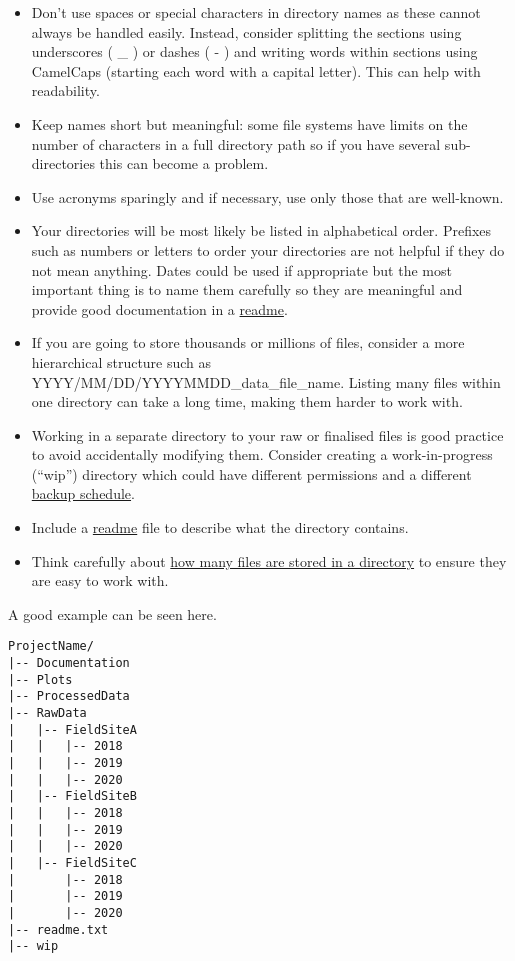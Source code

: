 \documentclass[12pt,a4paper,oneside]{report}
\providecommand{\tightlist}{%
  \setlength{\itemsep}{0pt}\setlength{\parskip}{0pt}}
\begin{document}
\begin{itemize}
\tightlist
\item
  Don't use spaces or special characters in directory names as these
  cannot always be handled easily. Instead, consider splitting the
  sections using underscores ( \_ ) or dashes ( - ) and writing words
  within sections using CamelCaps (starting each word with a capital
  letter). This can help with readability.
\item
  Keep names short but meaningful: some file systems have limits on the
  number of characters in a full directory path so if you have several
  sub-directories this can become a problem.
\item
  Use acronyms sparingly and if necessary, use only those that are
  well-known.
\item
  Your directories will be most likely be listed in alphabetical order.
  Prefixes such as numbers or letters to order your directories are not
  helpful if they do not mean anything. Dates could be used if
  appropriate but the most important thing is to name them carefully so
  they are meaningful and provide good documentation in a
  \protect\hyperlink{readmetxt}{readme}.
\item
  If you are going to store thousands or millions of files, consider a
  more hierarchical structure such as
  YYYY/MM/DD/YYYYMMDD\_data\_file\_name. Listing many files within one
  directory can take a long time, making them harder to work with.
\item
  Working in a separate directory to your raw or finalised files is good
  practice to avoid accidentally modifying them. Consider creating a
  work-in-progress (``wip'') directory which could have different
  permissions and a different \protect\hyperlink{data-backing}{backup
  schedule}.
\item
  Include a \protect\hyperlink{readmetxt}{readme} file to describe what
  the directory contains.
\item
  Think carefully about
  \protect\hyperlink{number-of-files-in-a-directory}{how many files are
  stored in a directory} to ensure they are easy to work with.
\end{itemize}

A good example can be seen here.

\begin{verbatim}
ProjectName/
|-- Documentation
|-- Plots
|-- ProcessedData
|-- RawData
|   |-- FieldSiteA
|   |   |-- 2018
|   |   |-- 2019
|   |   |-- 2020
|   |-- FieldSiteB
|   |   |-- 2018
|   |   |-- 2019
|   |   |-- 2020
|   |-- FieldSiteC
|       |-- 2018
|       |-- 2019
|       |-- 2020
|-- readme.txt
|-- wip
\end{verbatim}
\end{document}
